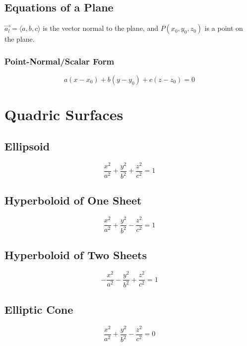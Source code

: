 \subsection{Equations of a Plane}
\(\vec{a_l} = \langle a, b, c \rangle\) is the vector normal to the plane, and \(P(x_0, y_0, z_0)\) is a point on the plane.
\subsubsection{Point-Normal/Scalar Form}
\begin{equation}\label{Point-Normal Form of a Plane}
    a(x-x_0) + b(y-y_0) + c(z-z_0) = 0
\end{equation}

\section{Quadric Surfaces}

\subsection{Ellipsoid}
\begin{equation}\label{Equation of an Ellipsoid}
    \dfrac{x^2}{a^2} + \dfrac{y^2}{b^2} + \dfrac{z^2}{c^2} = 1
\end{equation}

\subsection{Hyperboloid of One Sheet}
\begin{equation}\label{Equation of a Hyperboloid of One Sheet}
    \dfrac{x^2}{a^2} + \dfrac{y^2}{b^2} - \dfrac{z^2}{c^2} = 1
\end{equation}

\subsection{Hyperboloid of Two Sheets}
\begin{equation}\label{Equation of a Hyperboloid of Two Sheets}
    -\dfrac{x^2}{a^2} - \dfrac{y^2}{b^2} + \dfrac{z^2}{c^2} = 1
\end{equation}

\subsection{Elliptic Cone}
\begin{equation}\label{Equation of an Elliptic Cone}
    \dfrac{x^2}{a^2} + \dfrac{y^2}{b^2} - \dfrac{z^2}{c^2} = 0
\end{equation}

